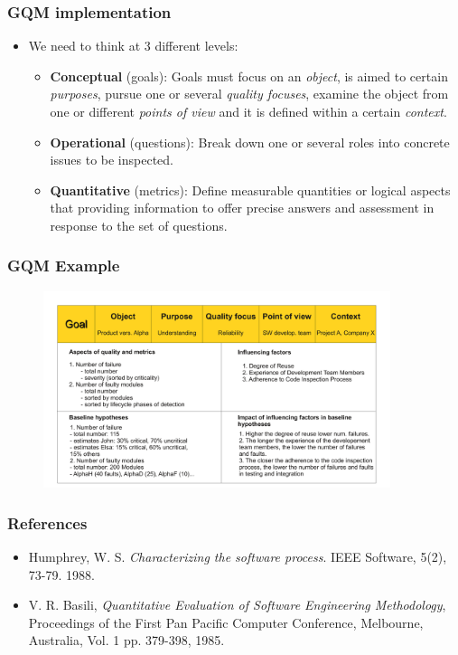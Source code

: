 \documentclass{beamer}
\begin{document}
\begin{frame}
 \frametitle{GQM implementation}
 \begin{itemize}
  \item We need to think at 3 different levels:
   \begin{itemize}
    \item \textbf{Conceptual} (goals): Goals must focus on an \textit{object},
is aimed to certain \textit{purposes}, pursue one or several \textit{quality focuses},
examine the object from one or different \textit{points of view} and it is
defined within a certain \textit{context}.
    \item \textbf{Operational} (questions): Break down one or several roles into
concrete issues to be inspected.
    \item \textbf{Quantitative} (metrics): Define measurable quantities or
logical aspects that providing information to offer precise answers and assessment in
response to the set of questions.
   \end{itemize}

  \end{itemize}


\end{frame}

\begin{frame}
 \frametitle{GQM Example}
  \begin{center}
  \begin{figure}
    \includegraphics[height=5.75cm]{figs/gqm-example.pdf}
  \end{figure}
  \end{center}
\end{frame}


\begin{frame}
 \frametitle{References}
 \begin{itemize}
  \item Humphrey, W. S. \textit{Characterizing the software process}.
IEEE Software, 5(2), 73-79. 1988.
  \item V. R. Basili, \textit{Quantitative Evaluation of Software Engineering Methodology}, 
Proceedings of the First Pan Pacific Computer Conference, Melbourne, 
Australia, Vol. 1 pp. 379-398, 1985.

  \end{itemize}

\end{frame}

\end{document}
